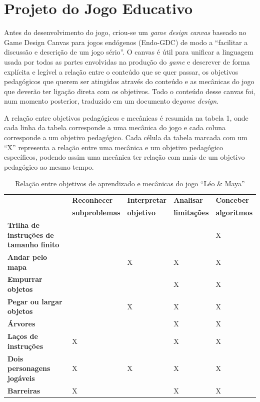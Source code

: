 \documentclass[conference]{IEEEtran}
\begin{document}
\section{Projeto do Jogo Educativo}
Antes do desenvolvimento do jogo, criou-se um \textit{game design canvas} baseado no Game Design Canvas para jogos endógenos (Endo-GDC) de modo a ``facilitar a discussão e descrição de um jogo sério''\cite{b19}. O canvas é útil para unificar a linguagem usada por todas as partes envolvidas na produção do \textit{game} e descrever de forma explícita e legível a relação entre o conteúdo que se quer passar, os objetivos pedagógicos que querem ser atingidos através do conteúdo e as mecânicas do jogo que deverão ter ligação direta com os objetivos. Todo o conteúdo desse canvas foi, num momento posterior, traduzido em um documento de\textit{game design}. 

A relação entre objetivos pedagógicos e mecânicas é resumida na tabela 1, onde cada linha da tabela corresponde a uma mecânica do jogo e cada coluna corresponde a um objetivo pedagógico. Cada célula da tabela marcada com um ``X'' representa a relação entre uma mecânica e um objetivo pedagógico específicos, podendo assim uma mecânica ter relação com mais de um objetivo pedagógico ao mesmo tempo.

\begin{table}[htbp]
\caption{Relação entre objetivos de aprendizado e mecânicas do jogo ``Léo \& Maya''}
\begin{center}
\begin{tabularx}{9.75cm}{|Y|Y|Y|Y|Y|}
\hline
\textbf{ }&\textbf{Reconhecer}&\textbf{Interpretar}&\textbf{Analisar}&\textbf{Conceber} \\
\textbf{ }&\textbf{subproblemas}&\textbf{objetivo}&\textbf{limitações}&\textbf{algoritmos} \\
\hline
\textbf{Trilha de instruções de tamanho finito} & & & & X  \\
\hline
\textbf{Andar pelo mapa} & & X & X & X \\
\hline
\textbf{Empurrar objetos} & & & X & X\\
\hline
\textbf{Pegar ou largar objetos} & & X & X & X\\
\hline
\textbf{Árvores} & & & X & X\\
\hline
\textbf{Laços de instruções} & X & & X & X\\
\hline
\textbf{Dois personagens jogáveis} & X & X & X & X\\
\hline
\textbf{Barreiras} & X & & X & X\\
\hline
\end{tabularx}
\label{tab1}
\end{center}
\end{table}
\end{document}
